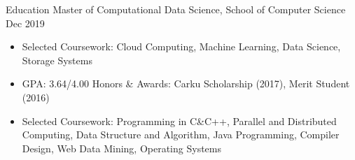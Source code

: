 \begin{MySection}{Education}
    {Master of Computational Data Science,
        \textnormal{School of Computer Science}
    }{Dec 2019}
    \begin{itemize}
        \item Selected Coursework:
        Cloud Computing,
        Machine Learning,
        Data Science,
        Storage Systems
    \end{itemize}

    \vspace{0.1pt}
    \begin{itemize}
        \item GPA: 3.64/4.00\qquad
        Honors \& Awards:
        Carku Scholarship (2017), 
        Merit Student (2016)
        \item Selected Coursework:
        Programming in C\&C++,
        Parallel and Distributed Computing,
        Data Structure and Algorithm,
        Java Programming,
        Compiler Design,
        Web Data Mining,
        Operating Systems
    \end{itemize}

\vspace{-0.15in}

\end{MySection}